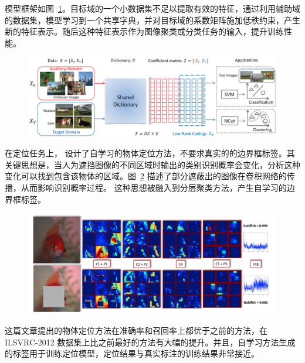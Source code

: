 模型框架如图~\ref{c2_fig8}。目标域的一个小数据集不足以提取有效的特征，通过利用辅助域的数据集，模型学习到一个共享字典，并对目标域的系数矩阵施加低秩约束，产生新的特征表示。随后这种特征表示作为图像聚类或分类任务的输入，提升训练性能。
    \begin{figure}[tbp]
        \centering 
        \includegraphics[width=1.0\textwidth]{img/c2/rel_b2.png}
        \label{c2_fig8}
    \end{figure}

在定位任务上，\citet{bazzani2016self} 设计了自学习的物体定位方法，不要求真实的的边界框标签。其关键思想是，当人为遮挡图像的不同区域时输出的类别识别概率会变化，分析这种变化可以找到包含该物体的区域。图~\ref{c2_fig9} 描述了部分遮蔽出的图像在卷积网络的传播，从而影响识别概率过程。
这种思想被融入到分层聚类方法，产生自学习的边界框标签。
    \begin{figure}[tbp]
        \centering 
        \includegraphics[width=1.0\textwidth]{img/c2/rel_b3.png}
        \label{c2_fig9}
    \end{figure}
这篇文章提出的物体定位方法在准确率和召回率上都优于之前的方法，在 ILSVRC-2012 数据集上比之前最好的方法有大幅的提升。并且，自学习方法生成的标签用于训练定位模型，定位结果与真实标注的训练结果非常接近。


